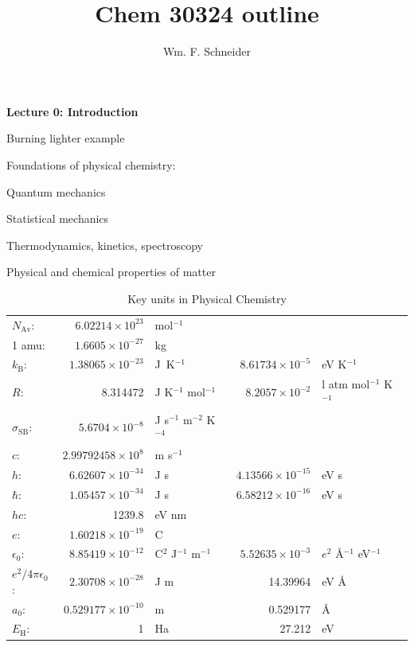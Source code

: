 \message{ !name(Outline.tex)}\documentclass[11pt]{article}
\title{Chem 30324 outline}
\author{Wm. F. Schneider}
\begin{document}


\maketitle
\begin{outline}
\item{{\bf Lecture 0: Introduction}}
  \begin{outline}
  \item{Burning lighter example}
  \item{Foundations of physical chemistry:}
    \begin{outline}
    \item{Quantum mechanics}
    \item{Statistical mechanics}
    \item{Thermodynamics, kinetics, spectroscopy}
    \item{Physical and chemical properties of matter}
    \end{outline}
  \end{outline}

\begin{table}
\begin{center}
\caption{Key units in Physical Chemistry}
\begin{tabular}{|lrlrl|} 
\hline
$N_\mathrm{Av}$: & $6.02214 \times 10^{23}$& mol$^{-1}$  & & \\
1 amu: & $1.6605\times 10^{-27}$ & kg & & \\
$k_\mathrm{B}$: & $1.38065\times 10^{-23}$ & J~K$^{-1}$ & $8.61734\times
10^{-5}$ & eV K$^{-1}$\\
$R$: & 8.314472 & J K$^{-1}$ mol$^{-1}$ & $8.2057 \times 10^{-2}$ & l atm mol$^{-1}$ K$^{-1}$\\
$\sigma_\mathrm{SB}$: & $5.6704\times 10^{-8}$ & J s$^{-1}$ m$^{-2}$ K$^{-4}$ & & \\
$c$: & $2.99792458\times 10^8$ & m s$^{-1}$ & & \\
$h$: & $6.62607\times 10^{-34}$ & J s & $4.13566\times 10^{-15}$ & eV s
\\
$\hbar$: & $1.05457\times 10^{-34}$ & J s & $6.58212\times 10^{-16}$&  eV s \\
$hc$: & 1239.8 & eV nm  & & \\
$e$: & $1.60218\times 10^{-19}$ &  C & & \\
$\epsilon_0$: & $8.85419 \times 10^{-12}$ & C$^2$ J$^{-1}$ m$^{-1}$ & $5.52635\times
10^{-3}$ & $e^2$ \AA$^{-1}$ eV$^{-1}$ \\
$e^2/4\pi\epsilon_0$: & $2.30708 \times 10^{-28}$&  J m & 14.39964 & eV \AA\\
$a_0$: & $0.529177 \times 10^{-10}$ & m & 0.529177 & \AA\\
$E_\mathrm{H} $: & 1 & Ha & 27.212 & eV \\
\hline
\end{tabular}
\end{center}
\end{table}



\end{outline}
\end{document}

